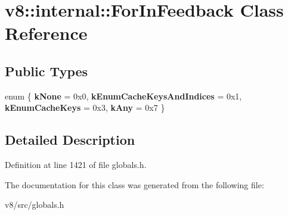 \hypertarget{classv8_1_1internal_1_1ForInFeedback}{}\section{v8\+:\+:internal\+:\+:For\+In\+Feedback Class Reference}
\label{classv8_1_1internal_1_1ForInFeedback}
\subsection*{Public Types}
\begin{DoxyCompactItemize}
\item 
\mbox{\label{classv8_1_1internal_1_1ForInFeedback_a96b56218b54d2006d3901f0edcdf9a3f}} 
enum \{ {\bfseries k\+None} = 0x0, 
{\bfseries k\+Enum\+Cache\+Keys\+And\+Indices} = 0x1, 
{\bfseries k\+Enum\+Cache\+Keys} = 0x3, 
{\bfseries k\+Any} = 0x7
 \}
\end{DoxyCompactItemize}


\subsection{Detailed Description}


Definition at line 1421 of file globals.\+h.



The documentation for this class was generated from the following file\+:\begin{DoxyCompactItemize}
\item 
v8/src/globals.\+h\end{DoxyCompactItemize}
